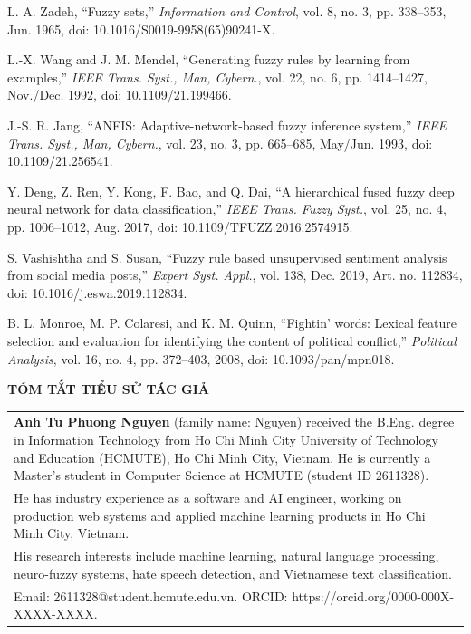 \documentclass[11pt,a4paper]{article}
\newcommand{\secvn}[1]{\vspace{6pt}\noindent\textbf{#1}\vspace{6pt}\par\nopagebreak}
\begin{document}
{\begin{refitem}[7] L. A. Zadeh, ``Fuzzy sets,'' \textit{Information and Control}, vol. 8, no. 3, pp. 338--353, Jun. 1965, doi: 10.1016/S0019-9958(65)90241-X.\end{refitem}
\begin{refitem}[8] L.-X. Wang and J. M. Mendel, ``Generating fuzzy rules by learning from examples,'' \textit{IEEE Trans. Syst., Man, Cybern.}, vol. 22, no. 6, pp. 1414--1427, Nov./Dec. 1992, doi: 10.1109/21.199466.\end{refitem}
\begin{refitem}[9] J.-S. R. Jang, ``ANFIS: Adaptive-network-based fuzzy inference system,'' \textit{IEEE Trans. Syst., Man, Cybern.}, vol. 23, no. 3, pp. 665--685, May/Jun. 1993, doi: 10.1109/21.256541.\end{refitem}
\begin{refitem}[10] Y. Deng, Z. Ren, Y. Kong, F. Bao, and Q. Dai, ``A hierarchical fused fuzzy deep neural network for data classification,'' \textit{IEEE Trans. Fuzzy Syst.}, vol. 25, no. 4, pp. 1006--1012, Aug. 2017, doi: 10.1109/TFUZZ.2016.2574915.\end{refitem}
\begin{refitem}[11] S. Vashishtha and S. Susan, ``Fuzzy rule based unsupervised sentiment analysis from social media posts,'' \textit{Expert Syst. Appl.}, vol. 138, Dec. 2019, Art. no. 112834, doi: 10.1016/j.eswa.2019.112834.\end{refitem}
\begin{refitem}[12] B. L. Monroe, M. P. Colaresi, and K. M. Quinn, ``Fightin' words: Lexical feature selection and evaluation for identifying the content of political conflict,'' \textit{Political Analysis}, vol. 16, no. 4, pp. 372--403, 2008, doi: 10.1093/pan/mpn018.\end{refitem}
}

\vspace{10pt}
\secvn{TÓM TẮT TIỂU SỬ TÁC GIẢ}

\noindent
\begin{tabular}{@{}p{15.9cm}@{}}
\textbf{Anh Tu Phuong Nguyen} (family name: Nguyen) received the B.Eng. degree in Information Technology from Ho Chi Minh City University of Technology and Education (HCMUTE), Ho Chi Minh City, Vietnam. He is currently a Master's student in Computer Science at HCMUTE (student ID 2611328).\\[3pt]
He has industry experience as a software and AI engineer, working on production web systems and applied machine learning products in Ho Chi Minh City, Vietnam.\\[3pt]
His research interests include machine learning, natural language processing, neuro-fuzzy systems, hate speech detection, and Vietnamese text classification.\\[3pt]
Email: 2611328@student.hcmute.edu.vn. ORCID: https://orcid.org/0000-000X-XXXX-XXXX.\\
\end{tabular}
\end{document}
